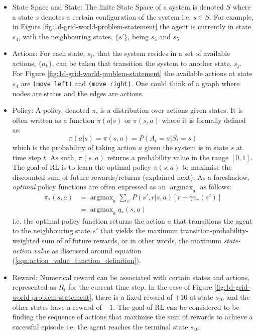\documentclass[a4paper,11pt]{article}
\DeclareMathOperator*{\argmax}{argmax}
\begin{document}
\begin{itemize}
    \item State Space and State: The finite State Space of a system is denoted $S$ where a state $s$ denotes a certain configuration of the system i.e. $s \in S$.  For example, in Figure \ref{fig:1d-grid-world-problem-statement} the agent is currently in state $s_4$, with the neighbouring states, $\{s'\}$, being $s_3$ and $s_5$.
    \item Actions: For each state, $s_i$, that the system resides in a set of available actions, $\{a_k\}$, can be taken that transition the system to another state, $s_j$.  For Figure \ref{fig:1d-grid-world-problem-statement} the available actions at state $s_4$ are \verb|(move left)| and \verb|(move right)|.  One could think of a graph where nodes are states and the edges are actions.
    \item Policy: A policy, denoted $\pi$, is a distribution over actions given states.  It is often written as a function $\pi(a|s)$ or $\pi(s, a)$ where it is formally defined as:
    \begin{equation} \label{eqn:policy_formal_definition}
        \pi(a|s) = \pi(s,a) = P(A_t=a|S_t=s)
    \end{equation}
    which is the probability of taking action $a$ given the system is in state $s$ at time step $t$. As such, $\pi(s, a)$ returns a probability value in the range $[0,1]$. The goal of RL is to learn the optimal policy $\pi(s,a)$ to maximise the discounted sum of future rewards/returns (explained next). As a foreshadow, {\it optimal} policy functions are often expressed as an $\argmax_a$ as follows:
    \begin{equation} \label{eqn:value_iteration_foreshadow}
    \begin{split}
        \pi_{*}(s,a) &= \argmax_a \sum_{s'} P(s',r|s,a)[r + \gamma v_{\pi}(s')] \\
        &= \argmax_a q_{*} (s,a)
    \end{split}
    \end{equation}
    i.e. the optimal policy function returns the action $a$ that transitions the agent to the neighbouring state $s'$ that yields the maximum transition-probability-weighted sum of of future rewards, or in other words, the maximum {\it state-action value} as discussed around equation (\ref{eqn:action_value_function_definition}).
    \item Reward: Numerical reward can be associated with certain states and actions, represented as $R_t$ for the current time step.  In the case of Figure \ref{fig:1d-grid-world-problem-statement}, there is a fixed reward of $+10$ at state $s_{10}$ and the other states have a reward of $-1$.  The goal of RL can be considered to be finding the sequence of actions that maximise the sum of rewards to achieve a sucessful episode i.e. the agent reaches the terminal state $s_{10}$.

\end{itemize}
\end{document}
